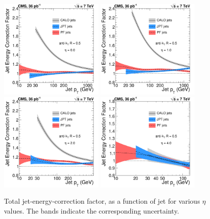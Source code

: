 \begin{figure}[ht!]
  \begin{center}
    \includegraphics[width=0.45\textwidth]{Figures/JEC/JEC_vs_CorPt_eta0}
    \includegraphics[width=0.45\textwidth]{Figures/JEC/JEC_vs_CorPt_eta10}
    \includegraphics[width=0.45\textwidth]{Figures/JEC/JEC_vs_CorPt_eta20}
    \includegraphics[width=0.45\textwidth]{Figures/JEC/JEC_vs_CorPt_eta40}
    \caption{Total jet-energy-correction factor, as a function of jet \pt for various $\eta$ values. The bands indicate the corresponding uncertainty.}
    \label{fig:finalJECvsPt}
  \end{center}
\end{figure}


